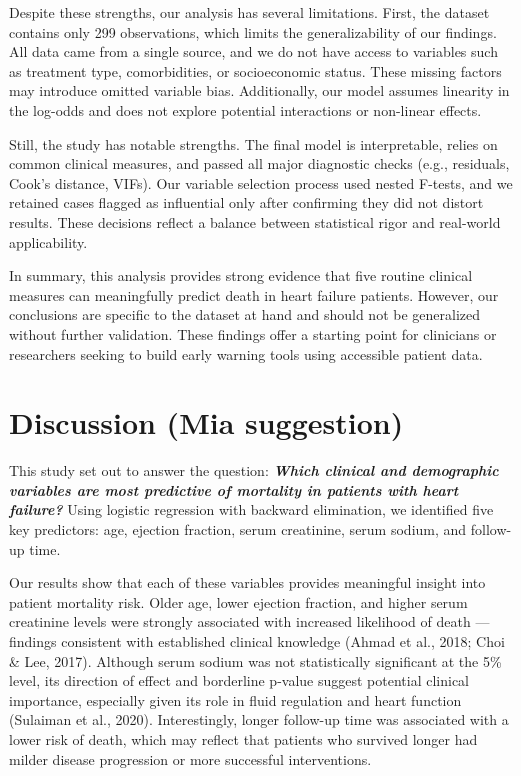 \documentclass[
  letterpaper,
  DIV=11,
  numbers=noendperiod]{scrartcl}
\begin{document}
Despite these strengths, our analysis has several limitations. First,
the dataset contains only 299 observations, which limits the
generalizability of our findings. All data came from a single source,
and we do not have access to variables such as treatment type,
comorbidities, or socioeconomic status. These missing factors may
introduce omitted variable bias. Additionally, our model assumes
linearity in the log-odds and does not explore potential interactions or
non-linear effects.

Still, the study has notable strengths. The final model is
interpretable, relies on common clinical measures, and passed all major
diagnostic checks (e.g., residuals, Cook's distance, VIFs). Our variable
selection process used nested F-tests, and we retained cases flagged as
influential only after confirming they did not distort results. These
decisions reflect a balance between statistical rigor and real-world
applicability.

In summary, this analysis provides strong evidence that five routine
clinical measures can meaningfully predict death in heart failure
patients. However, our conclusions are specific to the dataset at hand
and should not be generalized without further validation. These findings
offer a starting point for clinicians or researchers seeking to build
early warning tools using accessible patient data.

\hypertarget{discussion-mia-suggestion}{%
\section{Discussion (Mia suggestion)}\label{discussion-mia-suggestion}}

This study set out to answer the question: \textbf{\emph{Which clinical
and demographic variables are most predictive of mortality in patients
with heart failure?}} Using logistic regression with backward
elimination, we identified five key predictors: age, ejection fraction,
serum creatinine, serum sodium, and follow-up time.

Our results show that each of these variables provides meaningful
insight into patient mortality risk. Older age, lower ejection fraction,
and higher serum creatinine levels were strongly associated with
increased likelihood of death --- findings consistent with established
clinical knowledge (Ahmad et al., 2018; Choi \& Lee, 2017). Although
serum sodium was not statistically significant at the 5\% level, its
direction of effect and borderline p-value suggest potential clinical
importance, especially given its role in fluid regulation and heart
function (Sulaiman et al., 2020). Interestingly, longer follow-up time
was associated with a lower risk of death, which may reflect that
patients who survived longer had milder disease progression or more
successful interventions.
\end{document}
